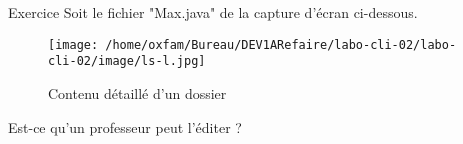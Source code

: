 \documentclass[a4paper,11pt]{article}
\begin{document}
\begin{Exercice}{Exercice}
	Soit le fichier "Max.java" de la capture d'\'ecran ci-dessous.  
	\begin{figure}[hbt]
		\begin{center}
			\texttt{[image: /home/oxfam/Bureau/DEV1ARefaire/labo-cli-02/labo-cli-02/image/ls-l.jpg]}
			
		\end{center}
		
		\caption[Contenu d\'etaill\'e d'un dossier]{Contenu d\'etaill\'e d'un dossier}
	\end{figure}
	
	Est-ce qu'un professeur peut l'\'editer ? 
	
	 {\footnotesize\emph{}\par} 
\end{Exercice}	
\end{document}
